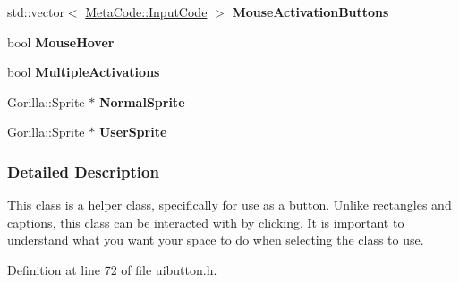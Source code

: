 \begin{DoxyCompactItemize}
\item 
\hypertarget{classMezzanine_1_1UI_1_1Button_aab112d6485c6ddd70dd638f3e8454d5d}{
std::vector$<$ \hyperlink{classMezzanine_1_1MetaCode_a3b5633f0145bf3287cf53a3f05b5563c}{MetaCode::InputCode} $>$ {\bfseries MouseActivationButtons}}
\label{classMezzanine_1_1UI_1_1Button_aab112d6485c6ddd70dd638f3e8454d5d}

\item 
\hypertarget{classMezzanine_1_1UI_1_1Button_afbc7a35d1922c62517e968ac4ac38316}{
bool {\bfseries MouseHover}}
\label{classMezzanine_1_1UI_1_1Button_afbc7a35d1922c62517e968ac4ac38316}

\item 
\hypertarget{classMezzanine_1_1UI_1_1Button_ae3eabadf14193c4e125e64daa419527f}{
bool {\bfseries MultipleActivations}}
\label{classMezzanine_1_1UI_1_1Button_ae3eabadf14193c4e125e64daa419527f}

\item 
\hypertarget{classMezzanine_1_1UI_1_1Button_a8fc26232d2b237d97d954aaa1116fcc3}{
Gorilla::Sprite $\ast$ {\bfseries NormalSprite}}
\label{classMezzanine_1_1UI_1_1Button_a8fc26232d2b237d97d954aaa1116fcc3}

\item 
\hypertarget{classMezzanine_1_1UI_1_1Button_a1bfdbf734d45501a4fb0073654161bc4}{
Gorilla::Sprite $\ast$ {\bfseries UserSprite}}
\label{classMezzanine_1_1UI_1_1Button_a1bfdbf734d45501a4fb0073654161bc4}

\end{DoxyCompactItemize}


\subsubsection{Detailed Description}
This class is a helper class, specifically for use as a button. Unlike rectangles and captions, this class can be interacted with by clicking. It is important to understand what you want your space to do when selecting the class to use. 

Definition at line 72 of file uibutton.h.



